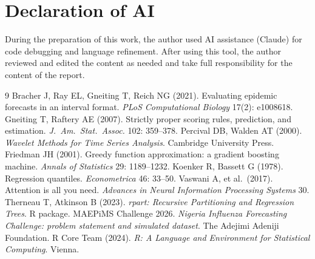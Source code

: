 \documentclass[11pt,a4paper]{article}
\begin{document}
\section*{Declaration of AI}
During the preparation of this work, the author used AI assistance (Claude) for code debugging and language refinement. After using this tool, the author reviewed and edited the content as needed and take full responsibility for the content of the report.
\begin{thebibliography}{9}
 Bracher J, Ray EL, Gneiting T, Reich NG (2021). Evaluating epidemic forecasts in an interval format. \emph{PLoS Computational Biology} 17(2): e1008618.
 Gneiting T, Raftery AE (2007). Strictly proper scoring rules, prediction, and estimation. \emph{J.\ Am.\ Stat.\ Assoc.} 102: 359--378.
 Percival DB, Walden AT (2000). \emph{Wavelet Methods for Time Series Analysis}. Cambridge University Press.
 Friedman JH (2001). Greedy function approximation: a gradient boosting machine. \emph{Annals of Statistics} 29: 1189--1232.
 Koenker R, Bassett G (1978). Regression quantiles. \emph{Econometrica} 46: 33--50.
 Vaswani A, et al.\ (2017). Attention is all you need. \emph{Advances in Neural Information Processing Systems} 30.
 Therneau T, Atkinson B (2023). \emph{rpart: Recursive Partitioning and Regression Trees}. R package.
 MAEPiMS Challenge 2026. \emph{Nigeria Influenza Forecasting Challenge: problem statement and simulated dataset}. The Adejimi Adeniji Foundation.
 R Core Team (2024). \emph{R: A Language and Environment for Statistical Computing}. Vienna.
\end{thebibliography}

%
%
\end{document}
